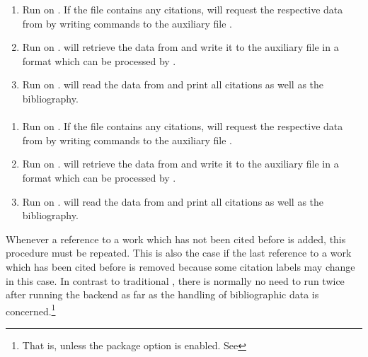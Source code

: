 \begin{enumerate}

\item Run  on . If the file contains any citations, \biblatex will request the respective data from \biber by writing commands to the auxiliary file .
\item Run  on . \biber will retrieve the data from  and write it to the auxiliary file  in a format which can be processed by \biblatex.
\item Run  on . \biblatex will read the data from  and print all citations as well as the bibliography.

\end{enumerate}

\paragraph{\bibtex}

\begin{enumerate}

\item Run  on . If the file contains any citations, \biblatex will request the respective data from \bibtex by writing commands to the auxiliary file .
\item Run  on . \bibtex will retrieve the data from  and write it to the auxiliary file  in a format which can be processed by \biblatex.
\item Run  on . \biblatex will read the data from  and print all citations as well as the bibliography.

\end{enumerate}

Whenever a reference to a work which has not been cited before is added, this procedure must be repeated. This is also the case if the last reference to a work which has been cited before is removed because some citation labels may change in this case. In contrast to traditional \bibtex, there is normally no need to run  twice after running the backend as far as the handling of bibliographic data is concerned.\footnote{That is, unless the  package option is enabled. See }

